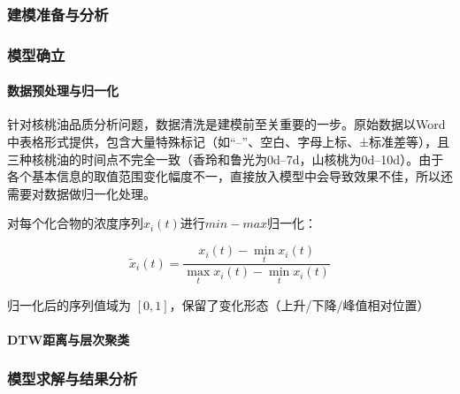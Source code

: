 \documentclass[10pt, a4paper, oneside]{ctexart}
\begin{document}
\subsubsection{建模准备与分析}

\subsubsection{模型确立}

\paragraph{数据预处理与归一化}\mbox{}\par
针对核桃油品质分析问题，数据清洗是建模前至关重要的一步。原始数据以Word中表格形式提供，包含大量特殊标记（如“--”、空白、字母上标、±标准差等），且三种核桃油的时间点不完全一致（香玲和鲁光为0d--7d，山核桃为0d--10d）。由于各个基本信息的取值范围变化幅度不一，直接放入模型中会导致效果不佳，所以还需要对数据做归一化处理。

对每个化合物的浓度序列$x_i(t)$进行$min-max$归一化：

\[
\tilde{x}_i(t) = \frac{x_i(t) - \min_t x_i(t)}{\max_t x_i(t) - \min_t x_i(t)}
\]

归一化后的序列值域为 $[0,1]$，保留了变化形态（上升/下降/峰值相对位置）

\paragraph{DTW距离与层次聚类}



\subsubsection{模型求解与结果分析}
\end{document}
